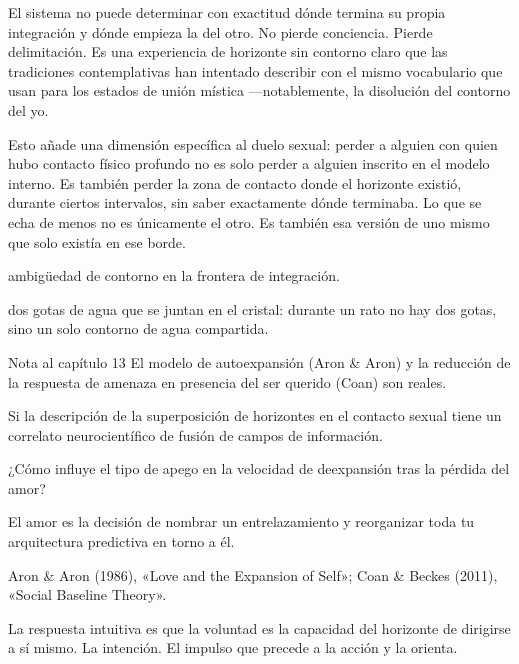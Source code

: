 El sistema no puede determinar con exactitud dónde termina su propia integración y dónde empieza la del otro. No pierde conciencia. Pierde delimitación. Es una experiencia de horizonte sin contorno claro que las tradiciones contemplativas han intentado describir con el mismo vocabulario que usan para los estados de unión mística —notablemente, la disolución del contorno del yo.

Esto añade una dimensión específica al duelo sexual: perder a alguien con quien hubo contacto físico profundo no es solo perder a alguien inscrito en el modelo interno. Es también perder la zona de contacto donde el horizonte existió, durante ciertos intervalos, sin saber exactamente dónde terminaba. Lo que se echa de menos no es únicamente el otro. Es también esa versión de uno mismo que solo existía en ese borde.

\begin{fisica}
 ambigüedad de contorno en la frontera de integración.

 dos gotas de agua que se juntan en el cristal: durante un rato no hay dos gotas, sino un solo contorno de agua compartida.
\end{fisica}
\begin{notacap}{Nota al capítulo 13}
 El modelo de autoexpansión (Aron \& Aron) y la reducción de la respuesta de amenaza en presencia del ser querido (Coan) son reales.

 Si la descripción de la superposición de horizontes en el contacto sexual tiene un correlato neurocientífico de fusión de campos de información.

 ¿Cómo influye el tipo de apego en la velocidad de deexpansión tras la pérdida del amor?

 El amor es la decisión de nombrar un entrelazamiento y reorganizar toda tu arquitectura predictiva en torno a él.

 Aron \& Aron (1986), «Love and the Expansion of Self»; Coan \& Beckes (2011), «Social Baseline Theory».
\end{notacap}
\noindent {}

\noindent La respuesta intuitiva es que la voluntad es la capacidad del horizonte de dirigirse a sí mismo. La intención. El impulso que precede a la acción y la orienta.

